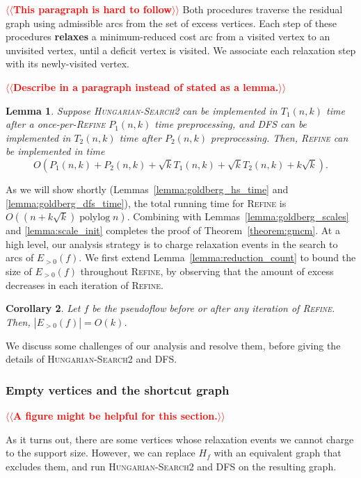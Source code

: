\documentclass[11pt]{article}
\makeatletter
\def\polylog{\mathop{\mathrm{polylog}}}
\theoremstyle{plain}
\newtheorem{lemma}{Lemma}[section]
\newtheorem{corollary}[lemma]{Corollary}
\numberwithin{figure}{section}
\def\EMPH#1{\textbf{\boldmath #1}}
\def\n@te#1{\textsf{\boldmath \textbf{$\langle\!\langle$#1$\rangle\!\rangle$}}\leavevmode}
\def\note#1{\textcolor{red}{\n@te{#1}}}
\makeatother
\begin{document}
\note{This paragraph is hard to follow}
Both procedures traverse the residual graph using admissible arcs from the set
of excess vertices.
Each step of these procedures \EMPH{relaxes} a minimum-reduced cost arc from a
visited vertex to an unvisited vertex, until a deficit vertex is visited.
We associate each relaxation step with its newly-visited vertex.

\note{Describe in a paragraph instead of stated as a lemma.}
\begin{lemma}
\label{lemma:goldberg_refine_time}
Suppose \textsc{Hungarian-Search2} can be implemented in $T_1(n, k)$ time after
a once-per-\textsc{Refine} $P_1(n, k)$ time preprocessing, and
\textsc{DFS} can be implemented in $T_2(n, k)$ time after $P_2(n, k)$ preprocessing.
Then, \textsc{Refine} can be implemented in time
\[
O(P_1(n, k) + P_2(n, k) + \sqrt{k}T_1(n, k) + \sqrt{k}T_2(n, k) + k\sqrt{k}).
\]
\end{lemma}

As we will show shortly (Lemmas~\ref{lemma:goldberg_hs_time} and \ref{lemma:goldberg_dfs_time}), the total running time for \textsc{Refine} is
$O((n + k\sqrt{k})\polylog n)$.
Combining with Lemmas~\ref{lemma:goldberg_scales} and \ref{lemma:scale_init}
completes the proof of Theorem~\ref{theorem:gmcm}.
At a high level, our analysis strategy is to charge relaxation events in
the search to arcs of $E_{>0}(f)$.
We first extend Lemma~\ref{lemma:reduction_count} to bound the size of
$E_{>0}(f)$ throughout \textsc{Refine}, by observing that the amount of excess
decreases in each iteration of \textsc{Refine}.

\begin{corollary}
\label{corollary:support_size_during}
Let $f$ be the pseudoflow before or after any iteration of \textsc{Refine}.
Then, $|E_{>0}(f)| = O(k)$.
\end{corollary}

We discuss some challenges of our analysis and resolve them, before giving
the details of \textsc{Hungarian-Search2} and \textsc{DFS}.

\subsubsection{Empty vertices and the shortcut graph}

\note{A figure might be helpful for this section.}

As it turns out, there are some vertices whose relaxation events we cannot
charge to the support size.
However, we can replace $H_f$ with an equivalent graph that excludes them,
and run \textsc{Hungarian-Search2} and \textsc{DFS} on the resulting graph.
\end{document}
